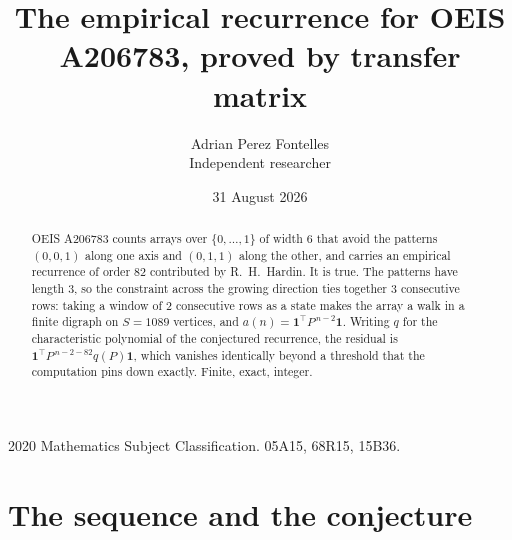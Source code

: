 \documentclass[11pt,a4paper]{article}
\title{The empirical recurrence for OEIS A206783, proved by transfer matrix}
\author{Adrian Perez Fontelles\\ \small Independent researcher}
\date{31 August 2026}
\theoremstyle{plain}
\theoremstyle{definition}
\begin{document}
\maketitle

\begin{abstract}
OEIS A206783 counts arrays over $\{0,\dots,1\}$ of width $6$ that avoid the patterns
$(0,0,1)$ along one axis and $(0,1,1)$ along the other, and carries an empirical recurrence of
order $82$ contributed by R.~H.~Hardin. It is true. The patterns have length $3$, so
the constraint across the growing direction ties together $3$ consecutive rows: taking a
window of $2$ consecutive rows as a state makes the array a walk in a finite digraph
on $S=1089$ vertices, and $a(n)=\mathbf{1}^{\!\top}P^{\,n-2}\mathbf{1}$. Writing $q$
for the characteristic polynomial of the conjectured recurrence, the residual is
$\mathbf{1}^{\!\top}P^{\,n-2-82}q(P)\mathbf{1}$, which vanishes identically
beyond a threshold that the computation pins down exactly. Finite, exact, integer.
\end{abstract}

\noindent\small 2020 Mathematics Subject Classification. 05A15, 68R15, 15B36.\normalsize

\section{The sequence and the conjecture}
\end{document}

